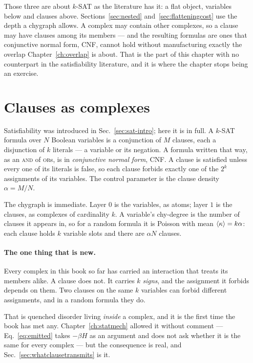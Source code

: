 Those three are about $k$-SAT as the literature has it: a flat object, variables
below and clauses above. Sections~\ref{sec:nested}
and~\ref{sec:flatteningcost} use the depth a chygraph allows.
A complex may contain other complexes, so a clause may have clauses among its
members --- and the resulting formulas are ones that conjunctive normal form,
CNF, cannot hold without
manufacturing exactly the overlap Chapter~\ref{ch:overlap} is about. That is
the part of this chapter with no counterpart in the satisfiability literature,
and it is where the chapter stops being an exercise.

\section{Clauses as complexes}
\label{sec:clauses}

Satisfiability was introduced in Sec.~\ref{sec:sat-intro}; here it is in full.
A $k$-SAT formula over $N$ Boolean variables is a conjunction of $M$ clauses,
each a disjunction of $k$ literals --- a variable or its negation. A formula
written that way, as an \textsc{and} of \textsc{or}s, is in \emph{conjunctive
normal form}, CNF. A clause is
satisfied unless every one of its literals is false, so each clause forbids
exactly one of the $2^{k}$ assignments of its variables. The control parameter
is the clause density $\alpha=M/N$.

The chygraph is immediate. Layer $0$ is the variables, as atoms; layer $1$ is
the clauses, as complexes of cardinality $k$. A variable's chy-degree is the
number of clauses it appears in, so for a random formula it is Poisson with mean
$\langle \kappa \rangle=k\alpha$: each clause holds $k$ variable slots and there are
$\alpha N$ clauses.

\paragraph{The one thing that is new.} Every complex in this book so far has
carried an interaction that treats its members alike. A clause does not. It
carries $k$ \emph{signs}, and the assignment it forbids depends on them. Two
clauses on the same $k$ variables can forbid different assignments, and in a
random formula they do.

That is quenched disorder living \emph{inside} a complex, and it is the first
time the book has met any. Chapter~\ref{ch:statmech} allowed it without
comment --- Eq.~\eqref{eq:emitted} takes $-\beta H$ as an argument and does not
ask whether it is the same for every complex --- but the consequence is real,
and Sec.~\ref{sec:whatclausetransmits} is it.

